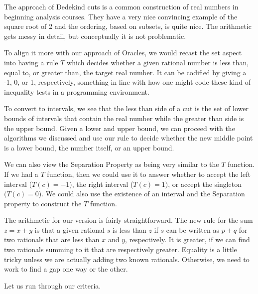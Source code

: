 \documentclass[12pt]{article}
\theoremstyle{remark}
\begin{document}
The approach of Dedekind cuts is a common construction of real numbers in beginning analysis courses. They have a very nice convincing example of the square root of 2 and the ordering, based on subsets, is quite nice. The arithmetic gets messy in detail, but conceptually it is not problematic. 

To align it more with our approach of Oracles, we would recast the set aspect into having a rule $T$ which decides whether a given rational number is less than, equal to, or greater than, the target real number. It can be codified by giving a -1, 0, or 1,  respectively, something in line with how one might code these kind of inequality tests in a programming environment. 

To convert to intervals, we see that the less than side of a cut is the set of lower bounds of intervals that contain the real number while the greater than side is the upper bound. Given a lower and upper bound, we can proceed with the algorithms we discussed and use our rule to decide whether the new middle point is a lower bound, the number itself, or an upper bound. 

We can also view the Separation Property as being very similar to the $T$ function. If we had a $T$ function, then we could use it to answer whether to accept the left interval ($T(c) = -1$), the right interval ($T(c)=1)$, or accept the singleton $(T(c) = 0$). We could also use the existence of an interval and the Separation property to construct the $T$ function.

The arithmetic for our version is fairly straightforward. The new rule for the sum  $z = x+y$ is that a given rational $s$ is less than $z$ if $s$ can be written as $p+q$ for two rationals that are less than $x$ and $y$, respectively. It is greater, if we can find two rationals summing to it that are respectively greater. Equality is a little tricky unless we are actually adding two known rationals. Otherwise, we need to work to find a gap one way or the other. 

Let us run through our criteria. 
\end{document}
